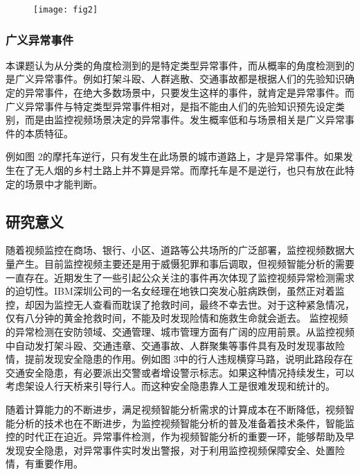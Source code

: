 \begin{figure}
    \centering
	\texttt{[image: fig2]}
	\label{fig:fig2}
\end{figure}




\subsubsection{广义异常事件}

本课题认为从分类的角度检测到的是特定类型异常事件，而从概率的角度检测到的是广义异常事件。例如打架斗殴、人群逃散、交通事故都是根据人们的先验知识确定的异常事件，在绝大多数场景中，只要发生这样的事件，就肯定是异常事件。而广义异常事件与特定类型异常事件相对，是指不能由人们的先验知识预先设定类别，而是由监控视频场景决定的异常事件。发生概率低和与场景相关是广义异常事件的本质特征。

例如图 2的摩托车逆行，只有发生在此场景的城市道路上，才是异常事件。如果发生在了无人烟的乡村土路上并不算是异常。而摩托车是不是逆行，也只有放在此特定的场景中才能判断。

\subsection{研究意义}
    随着视频监控在商场、银行、小区、道路等公共场所的广泛部署，监控视频数据大量产生。目前监控视频主要还是用于威慑犯罪和事后调取，但视频智能分析的需要一直存在。近期发生了一些引起公众关注的事件再次体现了监控视频异常检测需求的迫切性。IBM深圳公司的一名女经理在地铁口突发心脏病跌倒，虽然正对着监控，却因为监控无人查看而耽误了抢救时间，最终不幸去世。对于这种紧急情况，仅有八分钟的黄金抢救时间，不能及时发现险情和施救生命就会逝去。
    监控视频的异常检测在安防领域、交通管理、城市管理方面有广阔的应用前景。从监控视频中自动发打架斗殴、交通违章、交通事故、人群聚集等事件具有及时发现事故险情，提前发现安全隐患的作用。例如图 3中的行人违规横穿马路，说明此路段存在交通安全隐患，有必要派出交警或者增设警示标志。如果这种情况持续发生，可以考虑架设人行天桥来引导行人。而这种安全隐患靠人工是很难发现和统计的。

  随着计算能力的不断进步，满足视频智能分析需求的计算成本在不断降低，视频智能分析的技术也在不断进步，为监控视频智能分析的普及准备着技术条件，智能监控的时代正在迫近。异常事件检测，作为视频智能分析的重要一环，能够帮助及早发现安全隐患，对异常事件实时发出警报，对于利用监控视频保障安全、处置险情，有重要作用。

